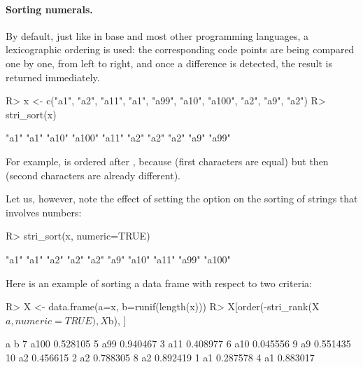 \documentclass[nojss]{jss}
\begin{document}
\paragraph{Sorting numerals.}
By default, just like in base  and most other programming
languages, a lexicographic ordering is used: the corresponding
code points are being compared one by one, from left to right,
and once a difference
is detected, the result is returned immediately.

\begin{Schunk}
\begin{Sinput}
R> x <- c("a1", "a2", "a11", "a1", "a99", "a10", "a100", "a2", "a9", "a2")
R> stri_sort(x)
\end{Sinput}
\begin{Soutput}
 [1] "a1"   "a1"   "a10"  "a100" "a11"  "a2"   "a2"   "a2"   "a9"   "a99"
\end{Soutput}
\end{Schunk}

For example,  is ordered after ,
because  (first characters are equal)
but then  (second characters are already different).

Let us, however, note the effect of setting the  option
on the sorting of strings that involves numbers:

\begin{Schunk}
\begin{Sinput}
R> stri_sort(x, numeric=TRUE)
\end{Sinput}
\begin{Soutput}
 [1] "a1"   "a1"   "a2"   "a2"   "a2"   "a9"   "a10"  "a11"  "a99"  "a100"
\end{Soutput}
\end{Schunk}




Here is an example of sorting a data frame
with respect to two criteria:

\begin{Schunk}
\begin{Sinput}
R> X <- data.frame(a=x, b=runif(length(x)))
R> X[order(-stri_rank(X$a, numeric=TRUE), X$b), ]
\end{Sinput}
\begin{Soutput}
      a        b
7  a100 0.528105
5   a99 0.940467
3   a11 0.408977
6   a10 0.045556
9    a9 0.551435
10   a2 0.456615
2    a2 0.788305
8    a2 0.892419
1    a1 0.287578
4    a1 0.883017
\end{Soutput}
\end{Schunk}
\end{document}
